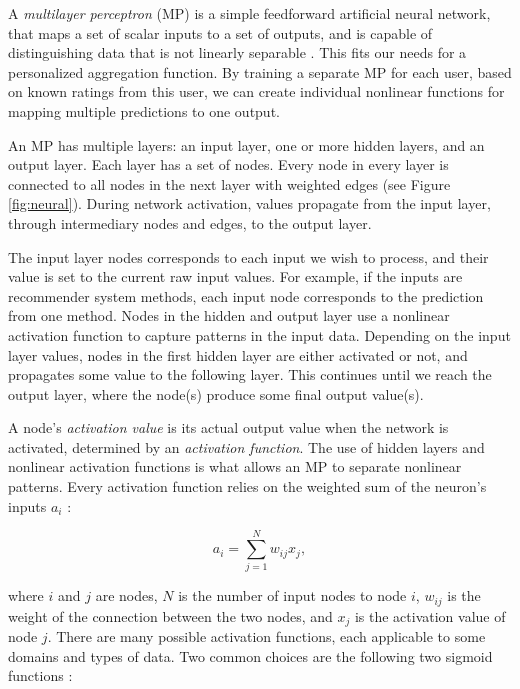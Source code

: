 A \emph{multilayer perceptron} (MP) is a simple 
feedforward artificial neural network,
that maps a set of scalar inputs to a set of outputs,
and is capable of distinguishing data that is not linearly separable
\cite[p578]{Russell1995}.
This fits our needs for a personalized aggregation function.
By training a separate MP for each user, based on known ratings from this user,
we can create individual nonlinear functions for mapping multiple 
predictions to one output.

An MP has multiple layers: an input layer, one or more hidden layers, and an output layer.
Each layer has a set of nodes.
Every node in every layer is connected to all nodes in the next layer
with weighted edges (see Figure \ref{fig:neural}).
During network activation, values propagate from the input layer, through intermediary nodes and edges,
to the output layer. 

The input layer nodes corresponds to each input we wish to process,
and their value is set to the current raw input values.
For example, if the inputs are recommender system methods,
each input node corresponds to the prediction from one method.
Nodes in the hidden and output layer use a nonlinear activation function 
to capture patterns in the input data.
Depending on the input layer values, nodes in the first hidden layer
are either activated or not, and propagates some value to the 
following layer. This continues until we reach the output layer,
where the node(s) produce some final output value(s).



A node's \emph{activation value} is its actual output value when the network is activated,
determined by an \emph{activation function}.
The use of hidden layers and nonlinear activation functions is what allows an MP
to separate nonlinear patterns. 
Every activation function relies on the weighted sum of the neuron's inputs $a_i$
\cite[p178]{Floreano2008}:

\begin{equation*}
  a_i = \sum_{j=1}^{N} w_{ij} x_j,
\end{equation*}

where $i$ and $j$ are nodes, $N$ is the number of input nodes to node $i$,
$w_{ij}$ is the weight of the connection between the two nodes,
and $x_{j}$ is the activation value of node $j$.
There are many possible activation functions,
each applicable to some domains and types of data.
Two common choices are the following two sigmoid functions
\cite[p179-180]{Floreano2008}:

